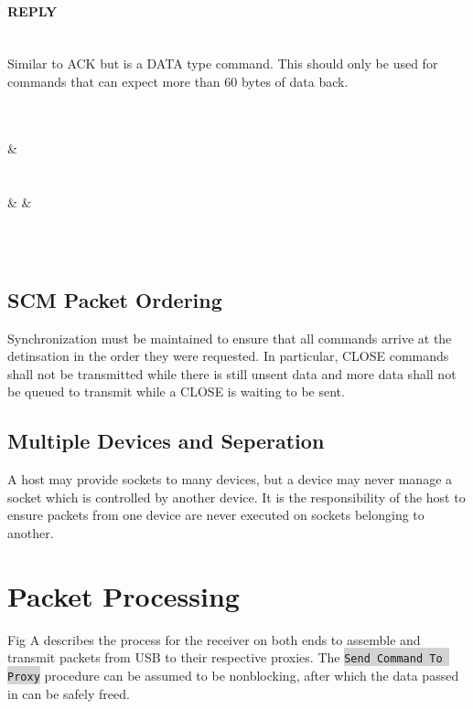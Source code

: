 \documentclass[10pt]{article}
\begin{document}
	\paragraph{REPLY} \mbox{}\\
	Similar to ACK but is a DATA type command. This should only be used for commands that can expect more than 60 bytes of data back. \\
	\\
	\begin{bytefield}[bitwidth=1.7em]{32}
		 \\
		 &
		 \\
		 \\
		 \\
		 &
		 &
		 \\
		 \\
	\end{bytefield}\\

	\subsection{SCM Packet Ordering}
	Synchronization must be maintained to ensure that all commands arrive at the detinsation in the order they were requested. In particular, CLOSE commands shall not be transmitted while there is still unsent data and more data shall not be queued to transmit while a CLOSE is waiting to be sent. 
	
	\subsection{Multiple Devices and Seperation}
	A host may provide sockets to many devices, but a device may never manage a socket which is controlled by another device. It is the responsibility of the host to ensure packets from one device are never executed on sockets belonging to another.
	
	\section{Packet Processing}
	Fig A describes the process for the receiver on both ends to assemble and transmit packets from USB to their respective proxies. The \colorbox{lightgray}{\lstinline{Send Command To Proxy}} procedure can be assumed to be nonblocking, after which the data passed in can be safely freed. \\
	\\	
\end{document}
